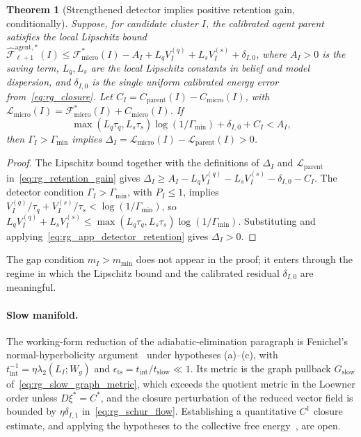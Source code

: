\documentclass[11pt]{article}
\newtheorem{theorem}{Theorem}
\begin{document}
\begin{theorem}[Strengthened detector implies positive retention gain, conditionally]
\label{thm:rg_detector_retention}
Suppose, for candidate cluster $I$, the calibrated agent parent satisfies the local Lipschitz bound $\widehat{\mathcal{F}}_{\ell+1}^{\mathrm{agent},*}(I) \le \mathcal{F}_{\mathrm{micro}}^*(I) - A_I + L_q V_I^{(q)} + L_s V_I^{(s)} + \delta_{I,0}$, where $A_I > 0$ is the saving term, $L_q, L_s$ are the local Lipschitz constants in belief and model dispersion, and $\delta_{I,0}$ is the single uniform calibrated energy error from~\eqref{eq:rg_closure}. Let $C_I = C_{\mathrm{parent}}(I) - C_{\mathrm{micro}}(I)$, with $\mathcal{L}_{\mathrm{micro}}(I) = \mathcal{F}_{\mathrm{micro}}^*(I) + C_{\mathrm{micro}}(I)$. If
\begin{equation}
\max(L_q\tau_q, L_s\tau_s)\log(1/\Gamma_{\min}) + \delta_{I,0} + C_I < A_I,
\label{eq:rg_app_detector_retention}
\end{equation}
then $\Gamma_I > \Gamma_{\min}$ implies $\Delta_I = \mathcal{L}_{\mathrm{micro}}(I) - \mathcal{L}_{\mathrm{parent}}(I) > 0$.
\end{theorem}

\begin{proof}
The Lipschitz bound together with the definitions of $\Delta_I$ and $\mathcal{L}_{\mathrm{parent}}$ in~\eqref{eq:rg_retention_gain} gives $\Delta_I \ge A_I - L_q V_I^{(q)} - L_s V_I^{(s)} - \delta_{I,0} - C_I$. The detector condition $\Gamma_I > \Gamma_{\min}$, with $P_I \le 1$, implies $V_I^{(q)}/\tau_q + V_I^{(s)}/\tau_s < \log(1/\Gamma_{\min})$, so $L_q V_I^{(q)} + L_s V_I^{(s)} \le \max(L_q\tau_q, L_s\tau_s)\log(1/\Gamma_{\min})$. Substituting and applying~\eqref{eq:rg_app_detector_retention} gives $\Delta_I > 0$.
\end{proof}

The gap condition $m_I>m_{\min}$ does not appear in the proof; it enters through the regime in which the Lipschitz bound and the calibrated residual $\delta_{I,0}$ are meaningful.

\paragraph{Slow manifold.}
The working-form reduction of the adiabatic-elimination paragraph is Fenichel's normal-hyperbolicity argument~\cite{fenichel1979geometric} under hypotheses (a)--(c), with $t_{\mathrm{int}}^{-1}=\eta\lambda_2(L_I;W_g)$ and $\epsilon_{\mathrm{ts}}=t_{\mathrm{int}}/t_{\mathrm{slow}}\ll1$. Its metric is the graph pullback $G_{\mathrm{slow}}$ of~\eqref{eq:rg_slow_graph_metric}, which exceeds the quotient metric in the Loewner order unless $D\xi^*=C^*$, and the closure perturbation of the reduced vector field is bounded by $\eta\delta_{I,1}$ in~\eqref{eq:rg_schur_flow}. Establishing a quantitative $C^1$ closure estimate, and applying the hypotheses to the collective free energy~\cite[Ch.~8]{DennisGaugeVFE2026}, are open.
\end{document}

